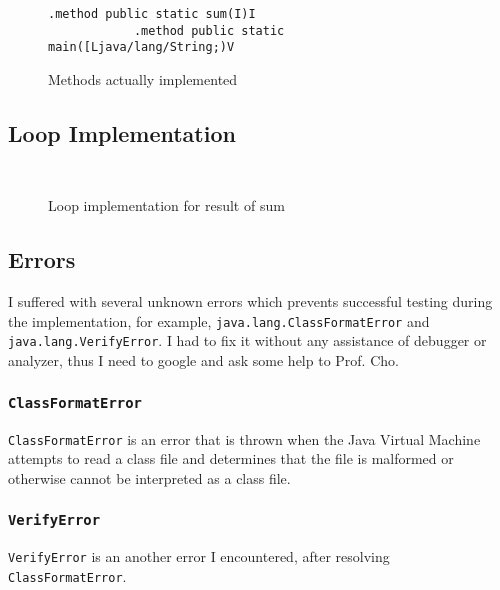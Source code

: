 \documentclass[a4paper, 12pt]{article}
\begin{document}
        \begin{figure}[H]
            \begin{lstlisting}[gobble=8]
            .method public static sum(I)I
            .method public static main([Ljava/lang/String;)V
            \end{lstlisting}
    
            \centering        
            \caption{Methods actually implemented}
        \end{figure}

        \subsection{Loop Implementation}
        \begin{figure}[H]
            \begin{lstlisting}[gobble=8]
            
            \end{lstlisting}
    
            \centering        
            \caption{Loop implementation for result of sum}
        \end{figure}
        
        \subsection{Errors}
        I suffered with several unknown errors which prevents successful testing during the implementation, for example, \texttt{java.lang.ClassFormatError} and \texttt{java.lang.VerifyError}. I had to fix it without any assistance of debugger or analyzer, thus I need to google and ask some help to Prof. Cho. 
    
            \subsubsection{\texttt{ClassFormatError}}
            \texttt{ClassFormatError} is an error that is thrown when the Java Virtual Machine attempts to read a class file and determines that the file is malformed or otherwise cannot be interpreted as a class file.
    
            \subsubsection{\texttt{VerifyError}}
            \texttt{VerifyError} is an another error I encountered, after resolving \texttt{ClassFormatError}.
\end{document}
